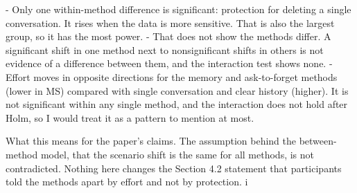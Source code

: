 - Only one within-method difference is significant: protection for deleting a single conversation. It rises when the data is more sensitive. That is also the largest group, so it has the most power.
- That does not show the methods differ. A significant shift in one method next to nonsignificant shifts in others is not evidence of a difference between them, and the interaction test shows none.
- Effort moves in opposite directions for the memory and ask-to-forget methods (lower in MS) compared with single conversation and clear history (higher). It is not significant within any single method, and the interaction does not hold after Holm, so I would treat it as a pattern to mention at most.

What this means for the paper's claims. The assumption behind the between-method model, that the scenario shift is the same for all methods, is not contradicted. Nothing here changes the Section 4.2 statement that participants told the methods apart by effort and not by protection.
i